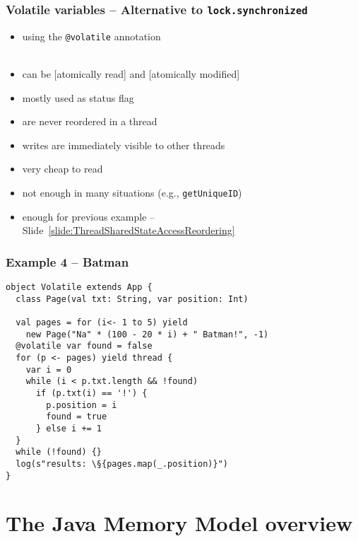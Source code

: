 \documentclass[aspectratio=169]{beamer}
\begin{document}
\begin{frame}\frametitle{Volatile variables -- Alternative to \texttt{lock.synchronized}}
\begin{itemize}
  \item using the \texttt{\alert{@volatile}} annotation
  \\~
  \item can be [atomically read] and [atomically modified]
  \item mostly used as status flag
  \item are never reordered in a thread
  \item writes are immediately visible to other threads
  \item very cheap to read
  \item not enough in many situations (e.g., \texttt{getUniqueID})
  \item enough for previous example -- Slide~\ref{slide:ThreadSharedStateAccessReordering}
\end{itemize}
\end{frame}

\begin{frame}[fragile]\frametitle{Example 4 -- Batman}
\begin{lstlisting}[emph={sleep,log,thread,join,synchronized,wait,notify,volatile,found}]
object Volatile extends App {
  class Page(val txt: String, var position: Int)

  val pages = for (i<- 1 to 5) yield
    new Page("Na" * (100 - 20 * i) + " Batman!", -1)
  @volatile var found = false
  for (p <- pages) yield thread {
    var i = 0
    while (i < p.txt.length && !found)
      if (p.txt(i) == '!') {
        p.position = i
        found = true
      } else i += 1
  }
  while (!found) {}
  log(s"results: \§{pages.map(_.position)}")
}
\end{lstlisting}
\end{frame}


\section{The Java Memory Model overview}
\end{document}
